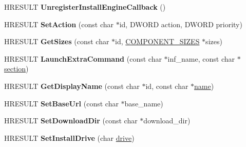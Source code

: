 \begin{DoxyCompactItemize}
\item 
\mbox{\label{interface_i_install_engine_ad7024ab0c3a876d9f32f012398759e2e}} 
H\+R\+E\+S\+U\+LT {\bfseries Unregister\+Install\+Engine\+Callback} ()
\item 
\mbox{\label{interface_i_install_engine_acea7bd99d1cd38a1c20f425f99ab7216}} 
H\+R\+E\+S\+U\+LT {\bfseries Set\+Action} (const char $\ast$id, D\+W\+O\+RD action, D\+W\+O\+RD priority)
\item 
\mbox{\label{interface_i_install_engine_a56f4682193b2f622f8593107247e9653}} 
H\+R\+E\+S\+U\+LT {\bfseries Get\+Sizes} (const char $\ast$id, \hyperlink{struct_c_o_m_p_o_n_e_n_t___s_i_z_e_s}{C\+O\+M\+P\+O\+N\+E\+N\+T\+\_\+\+S\+I\+Z\+ES} $\ast$sizes)
\item 
\mbox{\label{interface_i_install_engine_a19fecda6cd2db6793a6be4eec91c066e}} 
H\+R\+E\+S\+U\+LT {\bfseries Launch\+Extra\+Command} (const char $\ast$inf\+\_\+name, const char $\ast$\hyperlink{structsection}{section})
\item 
\mbox{\label{interface_i_install_engine_ae217f883513949327e863ed172064250}} 
H\+R\+E\+S\+U\+LT {\bfseries Get\+Display\+Name} (const char $\ast$id, const char $\ast$\hyperlink{structname}{name})
\item 
\mbox{\label{interface_i_install_engine_a9b3190335c4dd55f40c349b53225aaf3}} 
H\+R\+E\+S\+U\+LT {\bfseries Set\+Base\+Url} (const char $\ast$base\+\_\+name)
\item 
\mbox{\label{interface_i_install_engine_a6d524361d59c5ae2d8f7b815cccedeaa}} 
H\+R\+E\+S\+U\+LT {\bfseries Set\+Download\+Dir} (const char $\ast$download\+\_\+dir)
\item 
\mbox{\label{interface_i_install_engine_ae982e39597ab3c1939e654b527c85e67}} 
H\+R\+E\+S\+U\+LT {\bfseries Set\+Install\+Drive} (char \hyperlink{structdrive}{drive})
\item 
\mbox{\label{interface_i_install_engine_a54c7ce57c193d5692edfe2d52f5963ef}} 

\end{DoxyCompactItemize}
